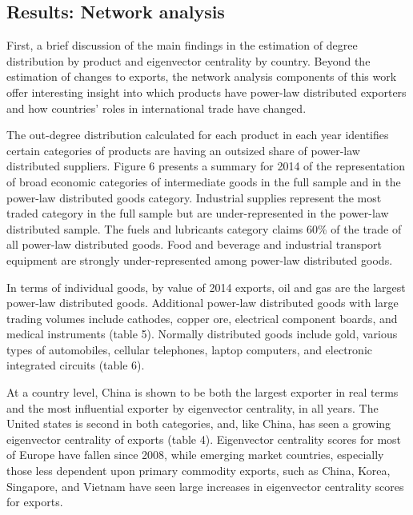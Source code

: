 \documentclass[10pt,letterpaper,pdftex]{article}
\begin{document}
\subsection{Results: Network analysis} \label{results_nw}
First, a brief discussion of the main findings in the estimation of degree distribution by product and eigenvector centrality by country. Beyond the estimation of changes to exports, the network analysis components of this work offer interesting insight into which products have power-law distributed exporters and how countries' roles in international trade have changed.

The out-degree distribution calculated for each product in each year identifies certain categories of products are having an outsized share of power-law distributed suppliers. Figure 6 presents a summary for 2014 of the representation of broad economic categories of intermediate goods in the full sample and in the power-law distributed goods category. Industrial supplies represent the most traded category in the full sample but are under-represented in the power-law distributed sample. The fuels and lubricants category claims 60\% of the trade of all power-law distributed goods. Food and beverage and industrial transport equipment are strongly under-represented among power-law distributed goods. 

In terms of individual goods, by value of 2014 exports, oil and gas are the largest power-law distributed goods. Additional power-law distributed goods with large trading volumes include cathodes, copper ore, electrical component boards, and medical instruments (table 5). Normally distributed goods include gold, various types of automobiles, cellular telephones, laptop computers, and electronic integrated circuits (table 6). 

At a country level, China is shown to be both the largest exporter in real terms and the most influential exporter by eigenvector centrality, in all years. The United states is second in both categories, and, like China, has seen a growing eigenvector centrality of exports (table 4). Eigenvector centrality scores for most of Europe have fallen since 2008, while emerging market countries, especially those less dependent upon primary commodity exports, such as China, Korea, Singapore, and Vietnam have seen large increases in eigenvector centrality scores for exports. 
\end{document}
